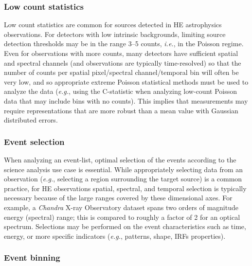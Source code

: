 \documentclass[11pt,a4paper]{ivoa}
\begin{document}
\subsubsection{Low count statistics}

Low count statistics are common for sources detected in \gls{HE} astrophysics observations.  For detectors with low intrinsic backgrounds, limiting source detection thresholds may be in the range 3--5 counts, {\em i.e.\/}, in the Poisson regime.  Even for observations with more counts, many detectors have sufficient spatial and spectral channels (and observations are typically time-resolved) so that the number of counts per spatial pixel/spectral channel/temporal bin will often be very low, and so appropriate extreme Poisson statistical methods must be used to analyze the data ({\em e.g.\/}, using the C-statistic when analyzing low-count Poisson data that may include bins with no counts).  This implies that measurements may require representations that are more robust than a mean value with Gaussian distributed errors.

\subsubsection{Event selection}


When analyzing an event-list, optimal selection of the events according to the science analysis use case is essential.  While appropriately selecting data from an observation ({\em e.g.\/}, selecting a region surrounding the target source) is a common practice, for \gls{HE} observations spatial, spectral, and temporal selection is typically necessary because of the large ranges covered by these dimensional axes.  For example, a {\em Chandra\/} X-ray Observatory dataset spans two orders of magnitude energy (spectral) range; this is compared to roughly a factor of 2 for an optical spectrum.  Selections may be performed on the event characteristics such as time, energy, or more specific indicators ({\em e.g.\/}, patterns, shape, \gls{IRF}s properties).

\subsubsection{Event binning}
\end{document}
